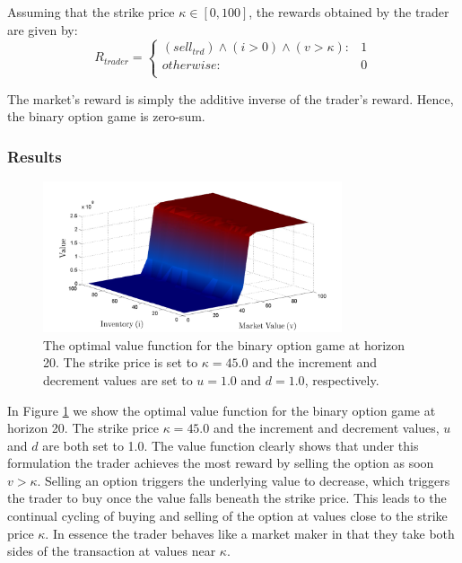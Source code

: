 Assuming that the strike price $\kappa \in [0, 100]$, the rewards obtained by the trader are given by:
{\small 
\begin{equation}
  R_{trader} = 
    \begin{cases}
      (sell_{trd}) \wedge (i > 0) \wedge (v > \kappa) : & 1 \\ 
      otherwise : & 0 \\
    \end{cases} \nonumber
\end{equation}
}%

The market's reward is simply the additive inverse of the trader's 
reward. Hence, the binary option game is zero-sum. 

\subsubsection{Results}


\begin{figure}[h!]
\includegraphics[width=250pt]{sbo.pdf}
\vspace{-3mm}
\caption{The optimal value function for the binary option game at horizon 20. The strike price is set to $\kappa = 45.0$ and the increment and
decrement values are set to $u = 1.0$ and $d = 1.0$, respectively.}
\label{fig:binaryoptionvfunc}
\end{figure}

In Figure \ref{fig:binaryoptionvfunc} we show the optimal value function for the
binary option game at horizon 20. The strike price $\kappa = 45.0$ and
the increment and decrement values, $u$ and $d$ are both set to 1.0. The
value function clearly shows that under this formulation the trader
achieves the most reward by selling the option as soon $v > \kappa$.
Selling an option triggers the underlying value to decrease, which triggers
the trader to buy once the value falls beneath the strike price. This leads
to the continual cycling of buying and selling of the option at values close
to the strike price $\kappa$. In essence the trader behaves like a market
maker in that they take both sides of the transaction at values near 
$\kappa$.

